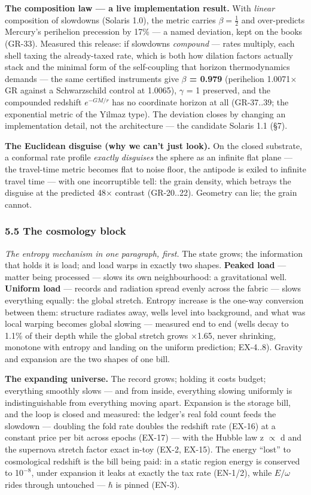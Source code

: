 \documentclass[
  11pt,
]{article}
\begin{document}
\textbf{The composition law --- a live implementation result.} With
\emph{linear} composition of slowdowns (Solaris 1.0), the metric carries
$\beta = \tfrac{1}{2}$ and over-predicts Mercury's perihelion precession by 17\% --- a
named deviation, kept on the books (GR-33). Measured this release: if
slowdowns \emph{compound} --- rates multiply, each shell taxing the
already-taxed rate, which is both how dilation factors actually stack
and the minimal form of the self-coupling that horizon thermodynamics
demands --- the same certified instruments give \textbf{$\beta$ = 0.979}
(perihelion 1.0071$\times$GR against a Schwarzschild control at 1.0065), $\gamma$ = 1
preserved, and the compounded redshift $e^{-GM/r}$ has no coordinate
horizon at all (GR-37..39; the exponential metric of the Yilmaz type).
The deviation closes by changing an implementation detail, not the
architecture --- the candidate Solaris 1.1 (\S{}7).

\textbf{The Euclidean disguise (why we can't just look).} On the closed
substrate, a conformal rate profile \emph{exactly disguises} the sphere
as an infinite flat plane --- the travel-time metric becomes flat to
noise floor, the antipode is exiled to infinite travel time --- with one
incorruptible tell: the grain density, which betrays the disguise at the
predicted 48$\times$ contrast (GR-20..22). Geometry can lie; the grain cannot.

\subsubsection{5.5 The cosmology block}\label{the-cosmology-block}

\emph{The entropy mechanism in one paragraph, first.} The state grows;
the information that holds it is load; and load warps in exactly two
shapes. \textbf{Peaked load} --- matter being processed --- slows its
own neighbourhood: a gravitational well. \textbf{Uniform load} ---
records and radiation spread evenly across the fabric --- slows
everything equally: the global stretch. Entropy increase is the one-way
conversion between them: structure radiates away, wells level into
background, and what was local warping becomes global slowing ---
measured end to end (wells decay to 1.1\% of their depth while the
global stretch grows $\times$1.65, never shrinking, monotone with entropy and
landing on the uniform prediction; EX-4..8). Gravity and expansion are
the two shapes of one bill.

\textbf{The expanding universe.} The record grows; holding it costs
budget; everything smoothly slows --- and from inside, everything
slowing uniformly is indistinguishable from everything moving apart.
Expansion is the storage bill, and the loop is closed and measured: the
ledger's real fold count feeds the slowdown --- doubling the fold rate
doubles the redshift rate (EX-16) at a constant price per bit across
epochs (EX-17) --- with the Hubble law z $\propto$ d and the supernova stretch
factor exact in-toy (EX-2, EX-15). The energy ``lost'' to cosmological
redshift is the bill being paid: in a static region energy is conserved
to 1$0^{-8}$, under expansion it leaks at exactly the tax rate (EN-1/2),
while $E/\omega$ rides through untouched --- $\hbar$ is pinned (EN-3).
\end{document}
